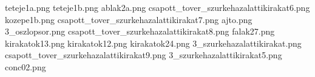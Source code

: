 teteje1a.png
teteje1b.png
ablak2a.png
csapott_tover_szurkehazalattikirakat6.png
kozepe1b.png
csapott_tover_szurkehazalattikirakat7.png
ajto.png
3_oszlopsor.png
csapott_tover_szurkehazalattikirakat8.png
falak27.png
kirakatok13.png
kirakatok12.png
kirakatok24.png
3_szurkehazalattikirakat.png
csapott_tover_szurkehazalattikirakat9.png
3_szurkehazalattikirakat5.png
conc02.png
